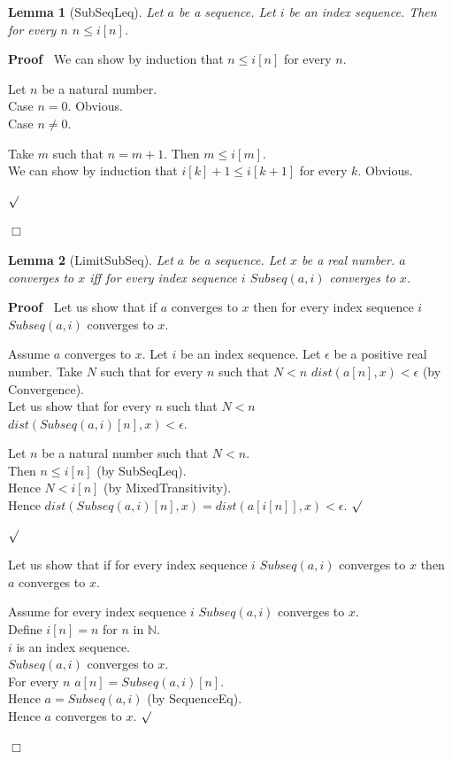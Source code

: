 \documentclass{article}
\newenvironment{forthel}{\begin{leftbar}}{\end{leftbar}}
\newenvironment{proof}{\noindent\textbf{Proof\ }}{\hspace*{\fill}$\Box$\medskip}
\newenvironment{subproof}{\begin{list}{}{}
		\item[\text{Proof}]}{\hfill $\surd$ \end{list}}
\newenvironment{case}{\begin{list}{}{}
		\item[]}{\end{list}}
\newtheorem{lemma}{Lemma}
\newcommand{\NN}{\mathbb{N}}
\begin{document}
\begin{forthel}
	\begin{lemma}[SubSeqLeq]
		Let $a$ be a sequence. Let $i$ be an index sequence. Then for every $n$ $n \leq i[n]$.
	\end{lemma}
	
	\begin{proof}
		We can show by induction that $n \leq i[n]$ for every $n$.
		\begin{subproof}
			Let $n$ be a natural number.\\
			Case $n = 0$. Obvious.\\
			Case $n \neq 0$.
			\begin{case}
				Take $m$ such that $n = m + 1$. Then $m \leq i[m]$.\\
				We can show by induction that $i[k] + 1 \leq i[k + 1]$ for every $k$. Obvious.
			\end{case}
		\end{subproof}
	\end{proof}
	
	\begin{lemma}[LimitSubSeq]
		Let $a$ be a sequence. Let $x$ be a real number. $a$ converges to $x$ iff for every index sequence $i$ $Subseq(a,i)$ converges to $x$. 
	\end{lemma}
	\begin{proof}
		Let us show that if $a$ converges to $x$ then for every index sequence $i$ $Subseq(a,i)$ converges to $x$.
		
		\begin{subproof}
			Assume $a$ converges to $x$. 
			Let $i$ be an index sequence.
			Let $\epsilon$ be a positive real number.
			Take $N$ such that for every $n$ such that $N < n$ $dist(a[n],x) < \epsilon$ (by Convergence).
			\\Let us show that for every $n$ such that $N < n$ \\ $dist(Subseq(a,i)[n],x) < \epsilon$.
			\begin{subproof}
				Let $n$ be a natural number such that $N < n$.\\
				Then $n \leq i[n]$ (by SubSeqLeq).\\
				Hence $N < i[n]$ (by MixedTransitivity).\\
				Hence $dist(Subseq(a,i)[n],x) = dist(a[i[n]],x) < \epsilon$.
			\end{subproof}
		\end{subproof}
		Let us show that if for every index sequence $i$ $Subseq(a,i)$ converges to $x$ then $a$ converges to $x$.
		\begin{subproof}
			Assume for every index sequence $i$ $Subseq(a,i)$ converges to $x$. \\
			Define $i[n] = n$ for $n$ in $\NN$.\\
			$i$ is an index sequence.\\
			$Subseq(a,i)$ converges to $x$. \\
			For every $n$ $a[n] = Subseq(a,i)[n]$. \\
			Hence $a = Subseq(a,i)$ (by SequenceEq). \\
			Hence $a$ converges to $x$.
		\end{subproof}
	\end{proof}
\end{forthel}
\end{document}
